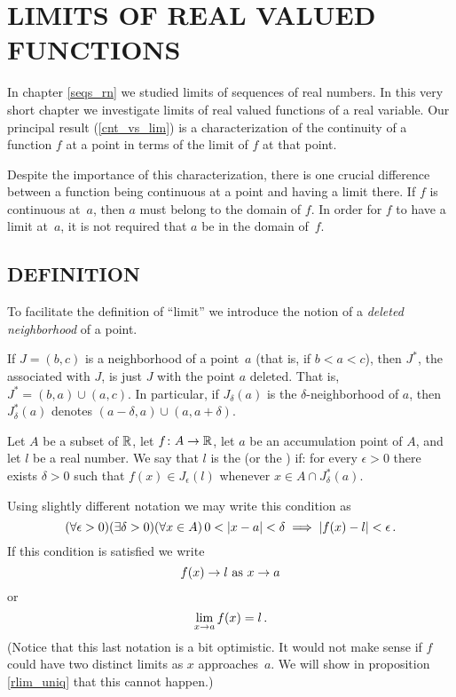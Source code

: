 \chapter{LIMITS OF REAL VALUED FUNCTIONS}\label{lim_rvf}

In chapter \ref{seqs_rn} we studied limits of sequences of real
numbers.  In this very short chapter we investigate limits of real
valued functions of a real variable.  Our principal result
(\ref{cnt_vs_lim}) is a characterization of the continuity of a
function $f$ at a point in terms of the limit of $f$ at that point.

Despite the importance of this characterization, there is one
crucial difference between a function being continuous at a point
and having a limit there.  If $f$ is continuous at~$a$, then $a$
must belong to the domain of $f$.  In order for $f$ to have a limit
at~$a$, it is not required that $a$ be in the domain of~$f$.




\section{DEFINITION} To facilitate the definition of ``limit'' we introduce the notion of a
\emph{deleted neighborhood} of a point.

\begin{defn} If $J = (b,c)$ is a neighborhood of a point~$a$ (that is, if $b < a < c$), then
$J^*$, the
 associated with $J$, is just $J$ with the point $a$ deleted.  That
is, $J^* = (b,a) \cup (a,c)$.  In particular, if $J_\delta(a)$ is the $\delta$-neighborhood of
$a$, then $J^*_\delta(a)$ denotes $(a-\delta,a) \cup (a,a+\delta)$.
\end{defn}

\begin{defn} Let $A$ be a subset of $\mathbb{R}$, let $f \colon A \rightarrow \mathbb{R}$, let $a$ be an accumulation
point of $A$, and let $l$ be a real number.  We say that $l$ is the
 (or the ) if: for every
$\epsilon > 0$ there exists $\delta > 0$ such that $f(x)\in J_\epsilon(l)$ whenever $x \in A
\cap J_\delta^*(a)$.

Using slightly different notation we may write this condition as
   \[ (\forall \epsilon > 0)(\exists \delta > 0)(\forall x \in A)\,
                    0 < \lvert x-a\rvert < \delta \implies \lvert f(x) - l\rvert < \epsilon\,. \]
If this condition is satisfied we write
      \[ f(x) \rightarrow l \text{ as } x \rightarrow a\]
or
   \[ \lim_{x \rightarrow a}f(x) = l\,. \]
(Notice that this last notation is a bit optimistic.  It would not make sense if $f$ could
have two distinct limits as $x$ approaches~$a$.  We will show in proposition \ref{rlim_uniq}
that this cannot happen.)
\end{defn}

